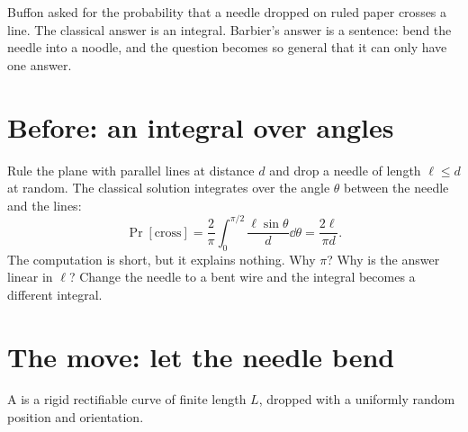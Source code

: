 \documentclass{missingbook}
\begin{document}
\frontmatter
{}
\mbtableofcontents

\mainmatter
{}

\begin{refsection}

\begin{chaptersummary}
Buffon asked for the probability that a needle dropped on ruled paper crosses a line. The classical answer is an integral. Barbier's answer is a sentence: bend the needle into a noodle, and the question becomes so general that it can only have one answer.
\end{chaptersummary}

\section{Before: an integral over angles}

Rule the plane with parallel lines at distance $d$ and drop a needle of length $\ell\le d$ at random. The classical solution integrates over the angle $\theta$ between the needle and the lines:
\[
  \Pr[\text{cross}] = \frac{2}{\pi}\int_0^{\pi/2}\frac{\ell\sin\theta}{d}\dd\theta = \frac{2\ell}{\pi d}.
\]
The computation is short, but it explains nothing. Why $\pi$? Why is the answer linear in $\ell$? Change the needle to a bent wire and the integral becomes a different integral.

\section{The move: let the needle bend}

\begin{definition}[Noodle]\label{def:sample:noodle}
A  is a rigid rectifiable curve of finite length $L$, dropped with a uniformly random position and orientation.
\end{definition}


\end{refsection}
\end{document}
